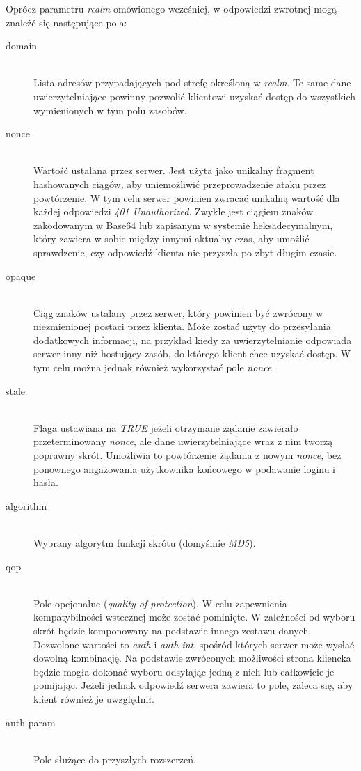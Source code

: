 \documentclass[11pt]{aghdpl}
\begin{document}
Oprócz parametru \emph{realm} omówionego wcześniej, w odpowiedzi zwrotnej mogą znaleźć się następujące pola:
\begin{description} %
\item[domain] \hfill \\
Lista adresów przypadających pod strefę określoną w \emph{realm}. Te same dane uwierzytelniające powinny pozwolić klientowi uzyskać dostęp do wszystkich wymienionych w tym polu zasobów.
\item[nonce] \hfill \\
Wartość ustalana przez serwer. Jest użyta jako unikalny fragment hashowanych ciągów, aby uniemożliwić przeprowadzenie ataku przez powtórzenie. W tym celu serwer powinien zwracać unikalną wartość dla każdej odpowiedzi \emph{401 Unauthorized}. Zwykle jest ciągiem znaków zakodowanym w Base64 lub zapisanym w systemie heksadecymalnym, który zawiera w sobie między innymi aktualny czas, aby umożlić sprawdzenie, czy odpowiedź klienta nie przyszła po zbyt długim czasie.
\item[opaque] \hfill \\
Ciąg znaków ustalany przez serwer, który powinien być zwrócony w niezmienionej postaci przez klienta. Może zostać użyty do przesyłania dodatkowych informacji, na przykład kiedy za uwierzytelnianie odpowiada serwer inny niż hostujący zasób, do którego klient chce uzyskać dostęp. W tym celu można jednak również wykorzystać pole \emph{nonce}.
\item[stale] \hfill \\
Flaga ustawiana na \emph{TRUE} jeżeli otrzymane żądanie zawierało przeterminowany \emph{nonce}, ale dane uwierzytelniające wraz z nim tworzą poprawny skrót. Umożliwia to powtórzenie żądania z nowym \emph{nonce}, bez ponownego angażowania użytkownika końcowego w podawanie loginu i hasła.
\item[algorithm] 
\hfill \\Wybrany algorytm funkcji skrótu (domyślnie \emph{MD5}).
\item[qop] \hfill \\
Pole opcjonalne (\emph{quality of protection}). W celu zapewnienia kompatybilności wstecznej może zostać pominięte. W zależności od wyboru skrót będzie komponowany na podstawie innego zestawu danych. Dozwolone wartości to \emph{auth} i \emph{auth-int}, spośród których serwer może wysłać dowolną kombinację. Na podstawie zwróconych możliwości strona kliencka będzie mogła dokonać wyboru odsyłając jedną z nich lub całkowicie je pomijając. Jeżeli jednak odpowiedź serwera zawiera to pole, zaleca się, aby klient również je uwzględnił.
\item[auth-param] \hfill \\
Pole służące do przyszłych rozszerzeń.
\end{description}
\end{document}
